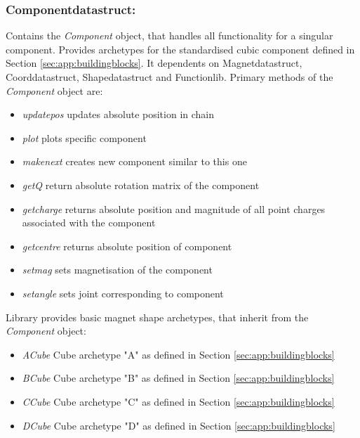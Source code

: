\subsubsection{Component\textunderscore data\textunderscore struct:} 
Contains the \textit{Component} object, that handles all functionality for a singular component. Provides archetypes for the standardised cubic component defined in Section \ref{sec:app:buildingblocks}. It dependents on Magnet\textunderscore data\textunderscore struct, Coord\textunderscore data\textunderscore struct, Shape\textunderscore data\textunderscore struct and Function\textunderscore lib. Primary methods of the \textit{Component} object are:
\begin{itemize}
    \item \textit{update\textunderscore pos} updates absolute position in chain
    \item \textit{plot} plots specific component
    \item \textit{make\textunderscore next} creates new component similar to this one
    \item \textit{get\textunderscore Q} return absolute rotation matrix of the component
    \item \textit{get\textunderscore charge} returns absolute position and magnitude of all point charges associated with the component
    \item \textit{get\textunderscore centre} returns absolute position of component
    \item \textit{set\textunderscore mag} sets magnetisation of the component
    \item \textit{set\textunderscore angle} sets joint corresponding to component
\end{itemize}
Library provides basic magnet shape archetypes, that inherit from the \textit{Component} object:
\begin{itemize}
    \item \textit{ACube} Cube archetype "A" as defined in Section \ref{sec:app:buildingblocks}
    \item \textit{BCube} Cube archetype "B" as defined in Section \ref{sec:app:buildingblocks}
    \item \textit{CCube} Cube archetype "C" as defined in Section \ref{sec:app:buildingblocks}
    \item \textit{DCube} Cube archetype "D" as defined in Section \ref{sec:app:buildingblocks}
\end{itemize}

